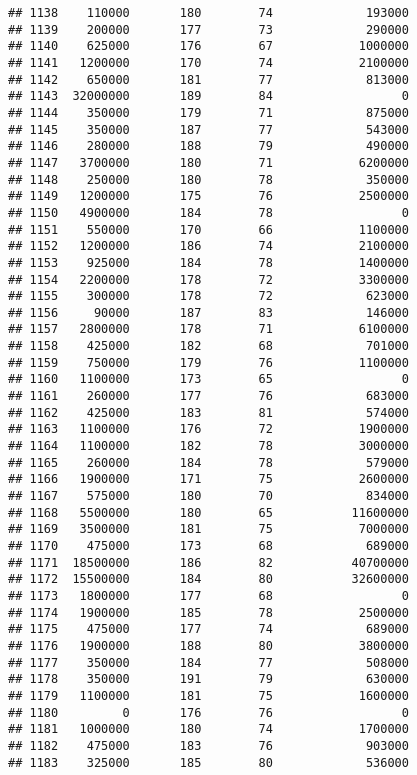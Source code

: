 \documentclass[
]{article}
\begin{document}
\begin{verbatim}
## 1138    110000       180        74             193000
## 1139    200000       177        73             290000
## 1140    625000       176        67            1000000
## 1141   1200000       170        74            2100000
## 1142    650000       181        77             813000
## 1143  32000000       189        84                  0
## 1144    350000       179        71             875000
## 1145    350000       187        77             543000
## 1146    280000       188        79             490000
## 1147   3700000       180        71            6200000
## 1148    250000       180        78             350000
## 1149   1200000       175        76            2500000
## 1150   4900000       184        78                  0
## 1151    550000       170        66            1100000
## 1152   1200000       186        74            2100000
## 1153    925000       184        78            1400000
## 1154   2200000       178        72            3300000
## 1155    300000       178        72             623000
## 1156     90000       187        83             146000
## 1157   2800000       178        71            6100000
## 1158    425000       182        68             701000
## 1159    750000       179        76            1100000
## 1160   1100000       173        65                  0
## 1161    260000       177        76             683000
## 1162    425000       183        81             574000
## 1163   1100000       176        72            1900000
## 1164   1100000       182        78            3000000
## 1165    260000       184        78             579000
## 1166   1900000       171        75            2600000
## 1167    575000       180        70             834000
## 1168   5500000       180        65           11600000
## 1169   3500000       181        75            7000000
## 1170    475000       173        68             689000
## 1171  18500000       186        82           40700000
## 1172  15500000       184        80           32600000
## 1173   1800000       177        68                  0
## 1174   1900000       185        78            2500000
## 1175    475000       177        74             689000
## 1176   1900000       188        80            3800000
## 1177    350000       184        77             508000
## 1178    350000       191        79             630000
## 1179   1100000       181        75            1600000
## 1180         0       176        76                  0
## 1181   1000000       180        74            1700000
## 1182    475000       183        76             903000
## 1183    325000       185        80             536000

\end{verbatim}
\end{document}
